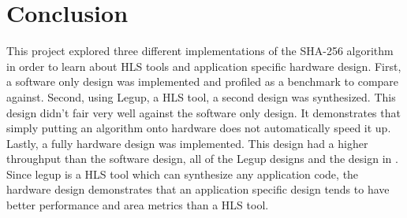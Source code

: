 \documentclass[conference]{IEEEtran}
\begin{document}
\section{Conclusion} \label{Conclusion}
This project explored three different implementations of the SHA-256 algorithm in order to learn about HLS tools and application specific hardware design. First, a software only design was implemented and profiled as a benchmark to compare against. Second, using Legup, a HLS tool, a second design was synthesized. This design didn't fair very well against the software only design. It demonstrates that simply putting an algorithm onto hardware does not automatically speed it up. Lastly, a fully hardware design was implemented. This design had a higher throughput than the software design, all of the Legup designs and the design in \cite{sklav}. Since legup is a HLS tool which can synthesize any application code, the hardware design demonstrates that an application specific design tends to have better performance and area metrics than a HLS tool. 






\end{document}
